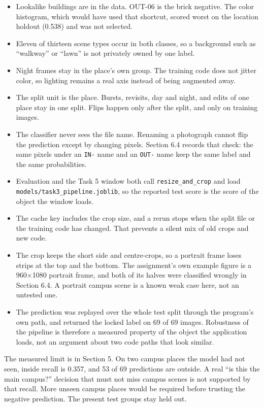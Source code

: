 \documentclass[11pt,a4paper]{article}
\providecommand{\tightlist}{%
  \setlength{\itemsep}{0pt}\setlength{\parskip}{0pt}}
\begin{document}
\begin{itemize}
\tightlist
\item
  Lookalike buildings are in the data. OUT-06 is the brick negative. The color histogram, which would have used that shortcut, scored worst on the location holdout (0.538) and was not selected.
\item
  Eleven of thirteen scene types occur in both classes, so a background such as ``walkway'' or ``lawn'' is not privately owned by one label.
\item
  Night frames stay in the place's own group. The training code does not jitter color, so lighting remains a real axis instead of being augmented away.
\item
  The split unit is the place. Bursts, revisits, day and night, and edits of one place stay in one split. Flips happen only after the split, and only on training images.
\item
  The classifier never sees the file name. Renaming a photograph cannot flip the prediction except by changing pixels. Section 6.4 records that check: the same pixels under an \texttt{IN-\allowbreak{}} name and an \texttt{OUT-\allowbreak{}} name keep the same label and the same probabilities.
\item
  Evaluation and the Task 5 window both call \texttt{resize\_\allowbreak{}and\_\allowbreak{}crop} and load \texttt{models/\allowbreak{}task3\_\allowbreak{}pipeline.joblib}, so the reported test score is the score of the object the window loads.
\item
  The cache key includes the crop size, and a rerun stops when the split file or the training code has changed. That prevents a silent mix of old crops and new code.
\item
  The crop keeps the short side and centre-crops, so a portrait frame loses strips at the top and the bottom. The assignment's own example figure is a 960×1080 portrait frame, and both of its halves were classified wrongly in Section 6.4. A portrait campus scene is a known weak case here, not an untested one.
\item
  The prediction was replayed over the whole test split through the program's own path, and returned the locked label on 69 of 69 images. Robustness of the pipeline is therefore a measured property of the object the application loads, not an argument about two code paths that look similar.
\end{itemize}

The measured limit is in Section 5. On two campus places the model had not seen, inside recall is 0.357, and 53 of 69 predictions are outside. A real ``is this the main campus?'' decision that must not miss campus scenes is not supported by that recall. More unseen campus places would be required before trusting the negative prediction. The present test groups stay held out.
\end{document}
